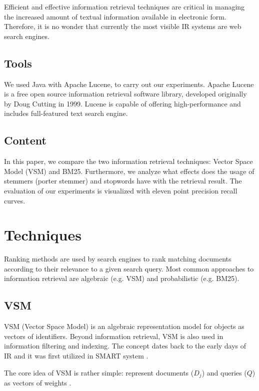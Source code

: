 Efficient and effective information retrieval techniques are critical in managing the increased amount of textual information available in electronic form. Therefore, it is no wonder that currently the most visible IR systems are web search engines.  

\subsection{Tools}


We used Java with Apache Lucene, to carry out our experiments. Apache Lucene is a free open source information retrieval software library, developed originally by Doug Cutting in 1999.  Lucene is capable of offering high-performance and includes full-featured text search engine.

\subsection{Content}

In this paper, we compare the two information retrieval techniques: Vector Space Model (VSM) and BM25. Furthermore, we analyze what effects does the usage of stemmers (porter stemmer) and stopwords have with the retrieval result. The evaluation of our experiments is visualized with eleven point precision recall curves. 



\section{Techniques}

Ranking methods are used by search engines to rank matching documents according to their relevance to a given search query. Most common approaches to information retrieval are algebraic (e.g. VSM) and probabilistic (e.g. BM25).

\subsection{VSM}

VSM (Vector Space Model) is an algebraic representation model for objects as vectors of identifiers. Beyond information retrieval, VSM is also used in information filtering and indexing. The concept dates back to the early days of IR and it was first utilized in SMART system \citep{dubin2004most}.

The core idea of VSM is rather simple: represent documents ($D_j$) and queries ($Q$) as vectors of weights \citep{Salton:1975:VSM:361219.361220}.

